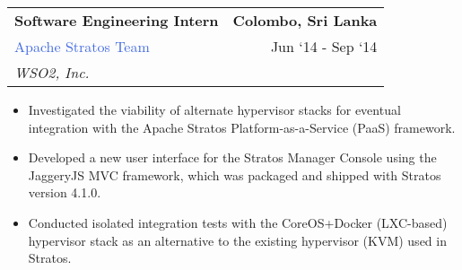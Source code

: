 \documentclass[10pt]{article}
\newcommand{\highlightcolor}{RoyalBlue}
\newcommand{\tabularxwidth}{\textwidth}
\begin{document}
    \begin{minipage}{\tabularxwidth}

        \begin{tabularx}{\tabularxwidth}{X r}
            \textbf{Software Engineering Intern} & \textbf{Colombo, 
        Sri Lanka} \\
            \textcolor{\highlightcolor}{Apache Stratos Team} & 
        
    Jun ‘14 - 
    Sep ‘14 \\
            
                
                    \textit{WSO2, Inc.} & \\
                
            
            
        \end{tabularx}

        \begin{itemize}[noitemsep, topsep=3pt, parsep=0pt, partopsep=0pt]
            
                \item 
    Investigated the viability of alternate hypervisor stacks for eventual integration with the Apache Stratos Platform-as-a-Service (PaaS) framework.
            
                \item 
    Developed a new user interface for the Stratos Manager Console using the JaggeryJS MVC framework, which was packaged and shipped with Stratos version 4.1.0.
            
                \item 
    Conducted isolated integration tests with the CoreOS+Docker (LXC-based) hypervisor stack as an alternative to the existing hypervisor (KVM) used in Stratos.
            
        \end{itemize}

        
            \vspace{.5em}
        

    \end{minipage}
    
\end{document}

